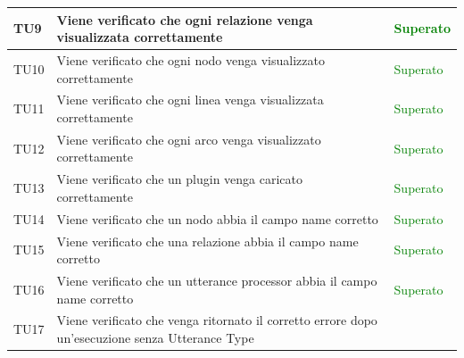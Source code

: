 \documentclass[openany,12pt,a4paper]{report}
\begin{document}
\begin{longtable}[c]{| p{2.5cm} |p{8cm} | p{2.5cm} |}
	\\[1em]
	\hline
	\newline TU9&
	\newline Viene verificato che ogni relazione venga visualizzata correttamente&
	\newline \textcolor{green}{Superato}
	\\[1em]
	\hline
	\newline TU10&
	\newline Viene verificato che ogni nodo venga visualizzato correttamente&
	\newline \textcolor{green}{Superato}
	\\[1em]
	\hline
	\newline TU11&
	\newline Viene verificato che ogni linea venga visualizzata correttamente&
	\newline \textcolor{green}{Superato}
	\\[1em]
	\hline
	\newline TU12&
	\newline Viene verificato che ogni arco venga visualizzato correttamente&
	\newline \textcolor{green}{Superato}
	\\[1em]
	\hline
	\newline TU13&
	\newline Viene verificato che un plugin venga caricato correttamente&
	\newline \textcolor{green}{Superato}
	\\[1em]
	\hline
	\newline TU14&
	\newline Viene verificato che un nodo abbia il campo name corretto&
	\newline \textcolor{green}{Superato}
	\\[1em]
	\hline
	\newline TU15&
	\newline Viene verificato che una relazione abbia il campo name corretto&
	\newline \textcolor{green}{Superato}
	\\[1em]
	\hline
	\newline TU16&
	\newline Viene verificato che un utterance processor abbia il campo name corretto&
	\newline \textcolor{green}{Superato}
	\\[1em]
	\hline
	\newline TU17&
	\newline Viene verificato che venga ritornato il corretto errore dopo un'esecuzione senza Utterance Type&

\end{longtable}
\end{document}
